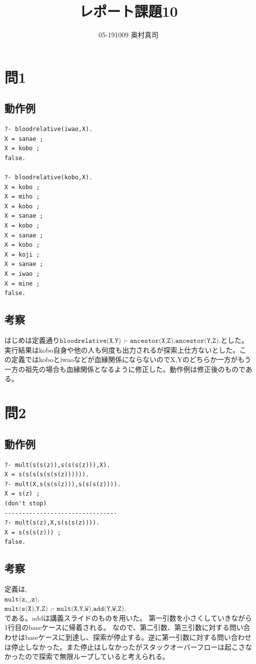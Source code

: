 \documentclass[11pt,a4paper]{jsarticle}
\title{レポート課題10}
\author{05-191009 奥村真司}
\date{}
\begin{document}
\maketitle
%
%
\section*{問1}
\subsection*{動作例}
\begin{lstlisting}[basicstyle=\ttfamily\footnotesize, frame=single]
?- bloodrelative(iwao,X).
X = sanae ;
X = kobo ;
false.

?- bloodrelative(kobo,X).
X = kobo ;
X = miho ;
X = kobo ;
X = sanae ;
X = kobo ;
X = sanae ;
X = kobo ;
X = koji ;
X = sanae ;
X = iwao ;
X = mine ;
false.
\end{lstlisting}
\subsection*{考察}
はじめは定義通り$\texttt{bloodrelative(X,Y) :- ancestor(X,Z),ancestor(Y,Z).}$とした。実行結果はkobo自身や他の人も何度も出力されるが探索上仕方ないとした。この定義ではkoboとiwaoなどが血縁関係にならないのでX,Yのどちらか一方がもう一方の祖先の場合も血縁関係となるように修正した。動作例は修正後のものである。
\section*{問2}
\subsection*{動作例}
\begin{lstlisting}[basicstyle=\ttfamily\footnotesize, frame=single]
?- mult(s(s(z)),s(s(s(z))),X).
X = s(s(s(s(s(s(z)))))).
?- mult(X,s(s(s(z))),s(s(s(z)))).
X = s(z) ;
(don't stop)
--------------------------------
?- mult(s(z),X,s(s(s(z)))).
X = s(s(s(z))) ;
false.
\end{lstlisting}
\subsection*{考察}
定義は,\\
$\texttt{mult(z,\_,z).}$\\
$\texttt{mult(s(X),Y,Z) :- mult(X,Y,W),add(Y,W,Z). }$\\である。addは講義スライドのものを用いた。
第一引数を小さくしていきながら1行目のbaseケースに帰着される。
なので、第二引数、第三引数に対する問い合わせはbaseケースに到達し、探索が停止する。逆に第一引数に対する問い合わせは停止しなかった。また停止はしなかったがスタックオーバーフローは起こさなかったので探索で無限ループしていると考えられる。
\end{document}
